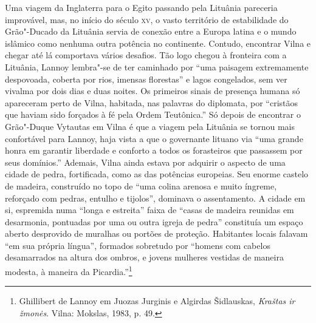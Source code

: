 Uma viagem da Inglaterra para o Egito passando pela Lituânia pareceria
improvável, mas, no início do século \textsc{xv}, o vasto território de
estabilidade do Grão"-Ducado da Lituânia servia de conexão entre a Europa
latina e o mundo islâmico como nenhuma outra potência no continente.
Contudo, encontrar Vilna e chegar até lá comportava vários desafios. Tão
logo chegou à fronteira com a Lituânia, Lannoy lembra"-se de ter
caminhado por ``uma paisagem extremamente despovoada, coberta por rios,
imensas florestas'' e lagos congelados, sem ver vivalma por dois dias e
duas noites. Os primeiros sinais de presença humana só apareceram perto
de Vilna, habitada, nas palavras do diplomata, por ``cristãos que haviam
sido forçados à fé pela Ordem Teutônica.'' Só depois de encontrar o
Grão"-Duque Vytautas em Vilna é que a viagem pela Lituânia se tornou mais
confortável para Lannoy, haja vista a que o governante lituano via ``uma
grande honra em garantir liberdade e conforto a todos os forasteiros que
passassem por seus domínios.'' Ademais, Vilna ainda estava por adquirir
o aspecto de uma cidade de pedra, fortificada, como as das potências
europeias. Seu enorme castelo de madeira, construído no topo de ``uma
colina arenosa e muito íngreme, reforçado com pedras, entulho e
tijolos'', dominava o assentamento. A cidade em si, espremida numa
``longa e estreita'' faixa de ``casas de madeira reunidas em desarmonia,
pontuadas por uma ou outra igreja de pedra'' constituía um espaço aberto
desprovido de muralhas ou portões de proteção. Habitantes locais falavam
``em sua própria língua'', formados sobretudo por ``homens com cabelos
desamarrados na altura dos ombros, e jovens mulheres vestidas de maneira
modesta, à maneira da Picardia.''\footnote{Ghillibert de Lannoy em Juozas Jurginis e Algirdas Šidlauskas, \textit{Kraštas ir žmonės}. Vilna: Mokslas, 1983, p. 49.}
%

